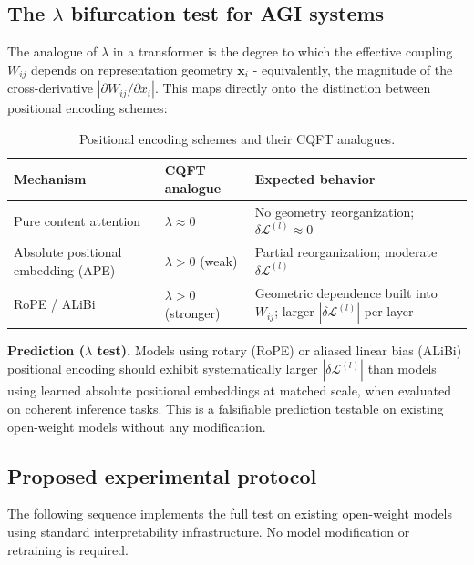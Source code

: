 \documentclass[12pt,a4paper]{article}
\theoremstyle{plain}
\theoremstyle{definition}
\begin{document}
\subsection{The $\lambda$ bifurcation test for AGI systems}
\label{subsec:lambda_bifurcation}

The analogue of $\lambda$ in a transformer is the degree to which the
effective coupling $W_{ij}$ depends on representation geometry
$\mathbf{x}_i$ - equivalently, the magnitude of the cross-derivative
$|\partial W_{ij}/\partial x_i|$. This maps directly onto the distinction
between positional encoding schemes:

\begin{table}[H]
\centering
\caption{Positional encoding schemes and their CQFT analogues.}
\label{tab:pos_enc}
\begin{tabular}{p{4.2cm} p{3cm} p{5.5cm}}
\toprule
\textbf{Mechanism} & \textbf{CQFT analogue} & \textbf{Expected behavior} \\
\midrule
Pure content attention & $\lambda \approx 0$ &
  No geometry reorganization; $\delta\mathcal{L}^{(l)} \approx 0$ \\[4pt]
Absolute positional embedding (APE) & $\lambda > 0$ (weak) &
  Partial reorganization; moderate $\delta\mathcal{L}^{(l)}$ \\[4pt]
RoPE / ALiBi & $\lambda > 0$ (stronger) &
  Geometric dependence built into $W_{ij}$;
  larger $|\delta\mathcal{L}^{(l)}|$ per layer \\
\bottomrule
\end{tabular}
\end{table}

\begin{keyresult}
\textbf{Prediction ($\lambda$ test).} Models using rotary (RoPE) or
aliased linear bias (ALiBi) positional encoding should exhibit
systematically larger $|\delta\mathcal{L}^{(l)}|$ than models using
learned absolute positional embeddings at matched scale, when evaluated
on coherent inference tasks. This is a falsifiable prediction testable
on existing open-weight models without any modification.
\end{keyresult}

\subsection{Proposed experimental protocol}
\label{subsec:protocol}

The following sequence implements the full test on existing open-weight
models using standard interpretability infrastructure. No model
modification or retraining is required.
\end{document}
